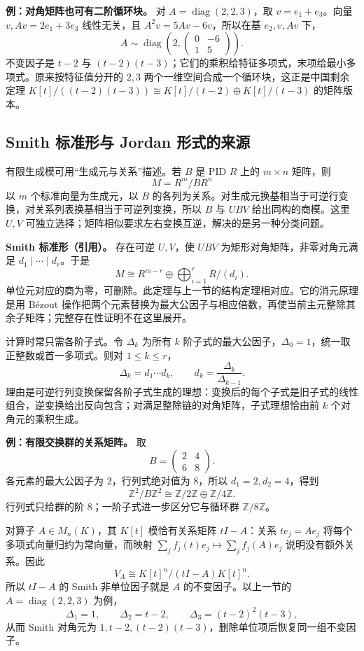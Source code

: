 \documentclass[12pt,fontset=fandol]{ctexart}
\begin{document}
\textbf{例：对角矩阵也可有二阶循环块。} 对 $A=\operatorname{diag}(2,2,3)$，取 $v=e_1+e_3$。向量 $v,Av=2e_1+3e_3$ 线性无关，且 $A^2v=5Av-6v$，所以在基 $e_2,v,Av$ 下，
\[
A\sim\operatorname{diag}\!\left(2,
\begin{pmatrix}0&-6\\1&5\end{pmatrix}\right).
\]
不变因子是 $t-2$ 与 $(t-2)(t-3)$；它们的乘积给特征多项式，末项给最小多项式。原来按特征值分开的 $2,3$ 两个一维空间合成一个循环块，这正是中国剩余定理 $K[t]/((t-2)(t-3))\cong K[t]/(t-2)\oplus K[t]/(t-3)$ 的矩阵版本。

\subsection{Smith 标准形与 Jordan 形式的来源}

\label{app:algebra-smith}

有限生成模可用“生成元与关系”描述。若 $B$ 是 PID $R$ 上的 $m\times n$ 矩阵，则
\[
M=R^m/B R^n
\]
以 $m$ 个标准向量为生成元，以 $B$ 的各列为关系。对生成元换基相当于可逆行变换，对关系列表换基相当于可逆列变换，所以 $B$ 与 $UBV$ 给出同构的商模。这里 $U,V$ 可独立选择；矩阵相似要求左右变换互逆，解决的是另一种分类问题。

\textbf{Smith 标准形（引用）。} 存在可逆 $U,V$，使 $UBV$ 为矩形对角矩阵，非零对角元满足 $d_1\mid\cdots\mid d_r$。于是
\[
M\cong R^{m-r}\oplus\bigoplus_{i=1}^r R/(d_i).
\]
单位元对应的商为零，可删除。此定理与上一节的结构定理相对应。它的消元原理是用 Bézout 操作把两个元素替换为最大公因子与相应倍数，再使当前主元整除其余子矩阵；完整存在性证明不在这里展开。

计算时常只需各阶子式。令 $\Delta_k$ 为所有 $k$ 阶子式的最大公因子，$\Delta_0=1$，统一取正整数或首一多项式。则对 $1\le k\le r$，
\[
\Delta_k=d_1\cdots d_k,
\qquad d_k=\frac{\Delta_k}{\Delta_{k-1}}.
\]
理由是可逆行列变换保留各阶子式生成的理想：变换后的每个子式是旧子式的线性组合，逆变换给出反向包含；对满足整除链的对角矩阵，子式理想恰由前 $k$ 个对角元的乘积生成。

\textbf{例：有限交换群的关系矩阵。} 取
\[
B=\begin{pmatrix}2&4\\6&8\end{pmatrix}.
\]
各元素的最大公因子为 $2$，行列式绝对值为 $8$，所以 $d_1=2,d_2=4$，得到
\[
\mathbb Z^2/B\mathbb Z^2\cong\mathbb Z/2\mathbb Z\oplus\mathbb Z/4\mathbb Z.
\]
行列式只给群的阶 $8$；一阶子式进一步区分它与循环群 $\mathbb Z/8\mathbb Z$。

对算子 $A\in M_n(K)$，其 $K[t]$ 模恰有关系矩阵 $tI-A$：关系 $te_j=Ae_j$ 将每个多项式向量归约为常向量，而映射 $\sum_j f_j(t)e_j\mapsto\sum_j f_j(A)e_j$ 说明没有额外关系。因此
\[
V_A\cong K[t]^n/(tI-A)K[t]^n.
\]
所以 $tI-A$ 的 Smith 非单位因子就是 $A$ 的不变因子。以上一节的 $A=\operatorname{diag}(2,2,3)$ 为例，
\[
\Delta_1=1,\qquad\Delta_2=t-2,\qquad
\Delta_3=(t-2)^2(t-3),
\]
从而 Smith 对角元为 $1,t-2,(t-2)(t-3)$，删除单位项后恢复同一组不变因子。
\end{document}

